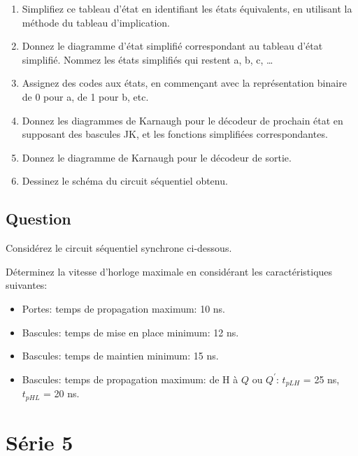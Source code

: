 \documentclass[letter, oneside]{book}
\begin{document}
\begin{enumerate}
\item Simplifiez ce tableau d'état en identifiant les états
équivalents, en utilisant la méthode du tableau d'implication.

\item Donnez le diagramme d'état simplifié correspondant au tableau
d'état simplifié. Nommez les états simplifiés qui restent a,
b, c, \dots{}

\item Assignez des codes aux états, en commençant avec la
représentation binaire de 0 pour a, de 1 pour b, etc.

\item Donnez les diagrammes de Karnaugh pour le décodeur de prochain
état en supposant des bascules JK, et les fonctions simplifiées
correspondantes.

\item Donnez le diagramme de Karnaugh pour le décodeur de sortie.

\item Dessinez le schéma du circuit séquentiel obtenu.
\end{enumerate}

\section*{Question}
\label{sec:orgc8c7646}
Considérez le circuit séquentiel synchrone ci-dessous.
\begin{center}

\end{center}

Déterminez la vitesse d'horloge maximale en considérant les
caractéristiques suivantes:

\begin{itemize}
\item Portes: temps de propagation maximum: 10 ns.

\item Bascules: temps de mise en place minimum: 12 ns.

\item Bascules: temps de maintien minimum: 15 ns.

\item Bascules: temps de propagation maximum: de H à \(Q\) ou
\(Q^{\prime}\): \(t_{pLH}\) = 25 ns, \(t_{pHL}\) = 20 ns.
\end{itemize}

\chapter*{Série 5}
\label{sec:org05446d1}
\end{document}
